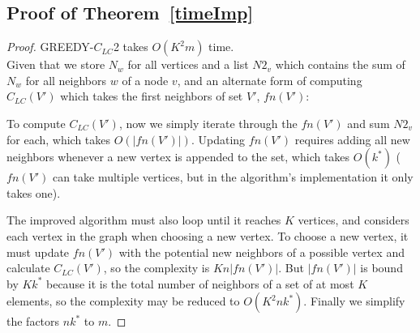 \subsection{Proof of Theorem~\ref{timeImp}}

\begin{proof}GREEDY-$C_{LC}$2 takes $O(K^2 m)$ time.\\

Given that we store $N_w$ for all vertices and a list $N2_v$ which contains the sum of $N_w$ for all neighbors $w$ of a node $v$, and an alternate form of computing $C_{LC}(V')$ which takes the first neighbors of set $V'$, $fn(V')$: 

To compute $C_{LC}(V')$, now we simply iterate through the $fn(V')$ and sum $N2_v$ for each, which takes $O(|fn(V')|)$.  Updating $fn(V')$ requires adding all new neighbors whenever a new vertex is appended to the set, which takes $O(k^*)$ ($fn(V')$ can take multiple vertices, but in the algorithm's implementation it only takes one).

The improved algorithm must also loop until it reaches $K$ vertices, and considers each vertex in the graph when choosing a new vertex.  To choose a new vertex, it must update $fn(V')$ with the potential new neighbors of a possible vertex and calculate $C_{LC}(V')$, so the complexity is $K n |fn(V')|$.  But $|fn(V')|$ is bound by $K k^*$ because it is the total number of neighbors of a set of at most $K$ elements, so the complexity may be reduced to $O(K^2 n k^*)$.  Finally we simplify the factors $n k^*$ to $m$.\end{proof}





